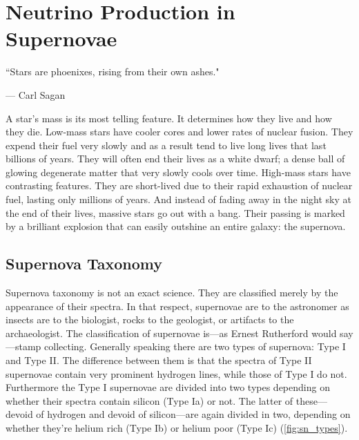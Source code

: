 %
%
%
%


\chapter{Neutrino Production in Supernovae}
	\label{supernovae_chapter}

	\vspace{-0.2in}

	\begin{quoting}
		\noindent \large ``Stars are phoenixes, rising from their own ashes." \normalsize

		--- Carl Sagan
	\end{quoting}

	 A star's mass is its most telling feature. It determines how they live and how they die. Low-mass stars have cooler cores and lower rates of nuclear fusion. They expend their fuel very slowly and as a result tend to live long lives that last billions of years. They will often end their lives as a white dwarf; a dense ball of glowing degenerate matter that very slowly cools over time. High-mass stars have contrasting features. They are short-lived due to their rapid exhaustion of nuclear fuel, lasting only millions of years. And instead of fading away in the night sky at the end of their lives, massive stars go out with a bang. Their passing is marked by a brilliant explosion that can easily outshine an entire galaxy: the supernova.
	

	\section{Supernova Taxonomy}
		Supernova taxonomy is not an exact science. They are classified merely by the appearance of their spectra. In that respect, supernovae are to the astronomer as insects are to the biologist, rocks to the geologist, or artifacts to the archaeologist. The classification of supernovae is---as Ernest Rutherford would say---stamp collecting. 
		Generally speaking there are two types of supernova: Type I and Type II. The difference between them is that the spectra of Type II supernovae contain very prominent hydrogen lines, while those of Type I do not. Furthermore the Type I supernovae are divided into two types depending on whether their spectra contain silicon (Type Ia) or not. The latter of these---devoid of hydrogen and devoid of silicon---are again divided in two, depending on whether they're helium rich (Type Ib) or helium poor (Type Ic) (\FIG \ref{fig:sn_types}).

